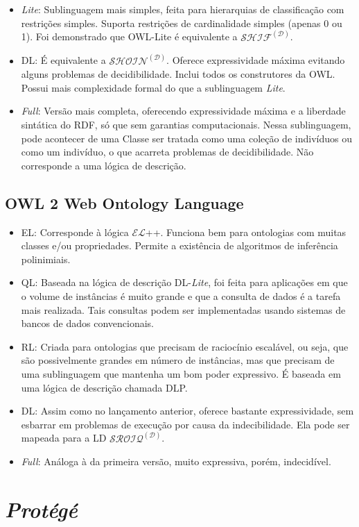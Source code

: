 \begin{itemize}
	\item \textit{Lite}: Sublinguagem mais simples, feita para hierarquias de classificação com restrições simples. Suporta restrições de cardinalidade simples (apenas 0 ou 1).  Foi demonstrado que OWL-Lite é equivalente a $ \mathcal{SHIF^{(D)}} $.
	\item DL: É equivalente a $ \mathcal{SHOIN^{(D)}} $. Oferece expressividade máxima evitando alguns problemas de decidibilidade. Inclui todos os construtores da OWL. Possui mais complexidade formal do que a sublinguagem \textit{Lite}.
	\item \textit{Full}: Versão mais completa, oferecendo expressividade máxima e a liberdade sintática do RDF, só que sem garantias computacionais. Nessa sublinguagem, pode acontecer de uma Classe ser tratada como uma coleção de indivíduos ou como um indivíduo, o que acarreta problemas de decidibilidade. Não corresponde a uma lógica de descrição.
\end{itemize}

\subsection{OWL 2 Web Ontology Language}

\begin{itemize}
	\item EL: Corresponde à lógica $ \mathcal{EL} $++. Funciona bem para ontologias com muitas classes e/ou propriedades. Permite a existência de algoritmos de inferência polinimiais.
	\item QL: Baseada na lógica de descrição DL-\textit{Lite}, foi feita para aplicações em que o volume de instâncias é muito grande e que a consulta de dados é a tarefa mais realizada. Tais consultas podem ser implementadas usando sistemas de bancos de dados convencionais.
	\item RL: Criada para ontologias que precisam de raciocínio escalável, ou seja, que são possivelmente grandes em número de instâncias, mas que precisam de uma sublinguagem que mantenha um bom poder expressivo. É baseada em uma lógica de descrição chamada DLP.
	\item DL: Assim como no lançamento anterior, oferece bastante expressividade, sem esbarrar em problemas de execução por causa da indecibilidade. Ela pode ser mapeada para a LD $ \mathcal{SROIQ^{(D)}} $. 
	\item \textit{Full}: Análoga à da primeira versão, muito expressiva, porém, indecidível.
\end{itemize}

\section{\textit{Protégé}}